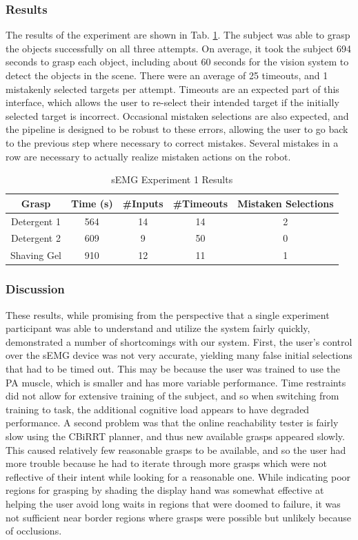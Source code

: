 \subsubsection{Results}
The results of the experiment are shown in Tab. \ref{tab:semg_table_1}. The subject was able to grasp the objects successfully on all three attempts. On average, it took the subject 694 seconds to grasp each object, including about 60 seconds for the vision system to detect the objects in the scene. There were an average of 25 timeouts, and 1 mistakenly selected targets per attempt. Timeouts are an expected part of this interface, which allows the user to re-select their intended target if the initially selected target is incorrect. Occasional mistaken selections are also expected, and the pipeline is designed to be robust to these errors, allowing the user to go back to the previous step where necessary to correct mistakes. Several mistakes in a row are necessary to actually realize mistaken actions on the robot.


\begin{table}
\centering
\begin{tabular}{|c|c|c|c|c|}
\hline
Grasp & Time (s) & \#Inputs & \#Timeouts & Mistaken Selections \\ \hline
Detergent 1 & 564 & 14 & 14 & 2\\ \hline
Detergent 2 & 609 & 9 & 50 & 0\\ \hline
Shaving Gel & 910 & 12 & 11 & 1\\ \hline
\end{tabular}
\caption{sEMG Experiment 1 Results}
\label{tab:semg_table_1}
\end{table}

\subsubsection{Discussion}
These results, while promising from the perspective that a single experiment participant was able to understand and utilize the system fairly quickly, demonstrated a number of shortcomings with our system. First, the user's control over the sEMG device was not very accurate, yielding many false initial selections that had to be timed out. This may be because the user was trained to use the PA muscle, which is smaller and has more variable performance. Time restraints did not allow for extensive training of the subject, and so when switching from training to task, the additional cognitive load appears to have degraded performance. A second problem was that the online reachability tester is fairly slow using the CBiRRT planner, and thus new available grasps appeared slowly. This caused relatively few reasonable grasps to be available, and so the user had more trouble because he had to iterate through more grasps which were not reflective of their intent while looking for a reasonable one. While indicating poor regions for grasping by shading the display hand was somewhat effective at helping the user avoid long waits in regions that were doomed to failure, it was not sufficient near border regions where grasps were possible but unlikely because of occlusions. 

